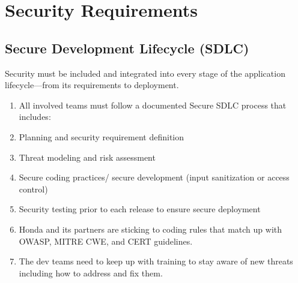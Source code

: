 \section{Security Requirements}
\subsection{Secure Development Lifecycle (SDLC)}
Security must be included and integrated into every stage of the application lifecycle—from its requirements to deployment.
\begin{enumerate}
    \item All involved teams must follow a documented Secure SDLC process that includes:
    \item Planning and security requirement definition 
    \item Threat modeling and risk assessment
    \item Secure coding practices/ secure development (input sanitization or access control)
    \item Security testing prior to each release to ensure secure deployment
\item Honda and its partners are sticking to coding rules that match up with OWASP, MITRE CWE, and CERT guidelines. 
\item The dev teams need to keep up with training to stay aware of new threats including how to address and fix them.
\end{enumerate}

